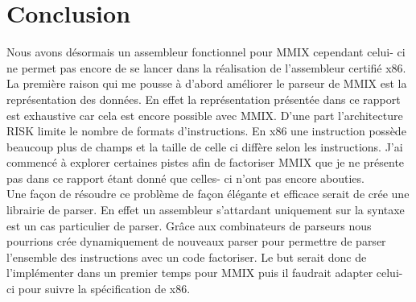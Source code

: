 \documentclass {article}
\theoremstyle{definition}
\theoremstyle{remark}
\begin{document}
\section{Conclusion}
\label{conclusion}

Nous avons désormais un assembleur fonctionnel pour MMIX cependant celui- ci ne permet pas encore de se lancer
dans la réalisation de l'assembleur certifié x86.\\
La première raison qui me pousse à d'abord améliorer le parseur de MMIX est la représentation des données.
En effet la représentation présentée dans ce rapport est exhaustive car cela est encore possible avec
MMIX. D'une part l'architecture RISK limite le nombre de formats d'instructions. En x86 une instruction possède
beaucoup plus de champs et la taille de celle ci diffère selon les instructions. J'ai commencé à explorer certaines
pistes afin de factoriser MMIX que je ne présente pas dans ce rapport étant donné que celles- ci n'ont pas encore abouties.
\\
Une façon de résoudre ce problème de façon élégante et efficace serait de crée une librairie de parser.
En effet un assembleur s'attardant uniquement sur la syntaxe est un cas particulier de parser.
Grâce aux combinateurs de parseurs nous pourrions crée dynamiquement de nouveaux parser pour
permettre de parser l'ensemble des instructions avec un code factoriser. Le but serait donc de l'implémenter
dans un premier temps pour MMIX puis il faudrait adapter celui- ci pour suivre la spécification de x86.


  
\end{document}
